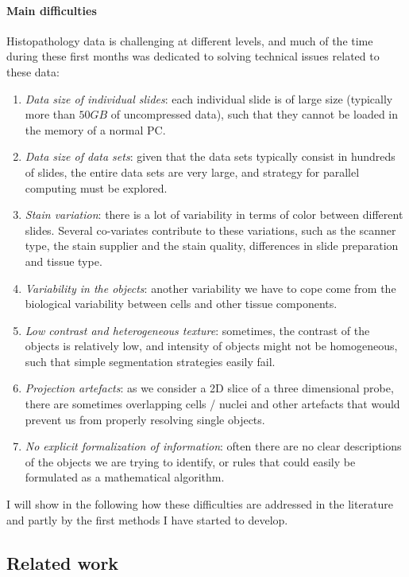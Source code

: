 \documentclass[a4paper,10pt]{article}
\begin{document}
\paragraph{Main difficulties}

Histopathology data is challenging at different levels, and much of
the time during these first months was dedicated to solving technical
issues related to these data: 
\begin{enumerate}
\item {\em Data size of individual slides}: each individual slide is
  of large size (typically more than $50 GB$ of uncompressed data),
  such that they cannot be loaded in the memory of a normal PC. 
\item {\em Data size of data sets}: given that the data sets typically
  consist in hundreds of slides, the entire data sets are very large,
  and strategy for parallel computing must be explored. 
\item {\em Stain variation}: there is a lot of variability in terms of
  color between different slides. Several co-variates contribute to
  these variations, such as the scanner type, the stain supplier and
  the stain quality, differences in slide preparation and tissue
  type. 
\item {\em Variability in the objects}: another variability we have to
  cope come from the biological variability between cells and other
  tissue components. 
\item {\em Low contrast and heterogeneous texture}: sometimes, the contrast of the objects is
  relatively low, and intensity of objects might not be homogeneous,
  such that simple segmentation strategies easily fail. 
\item {\em Projection artefacts}: as we consider a 2D slice of a three
  dimensional probe, there are sometimes overlapping cells / nuclei
  and other artefacts that would prevent us from properly resolving
  single objects.  
\item {\em No explicit formalization of information}: often there are
  no clear descriptions of the objects we are trying to identify, or
  rules that could easily be formulated as a mathematical algorithm.  
\end{enumerate}

I will show in the following how these difficulties are addressed in
the literature and partly by the first methods I have started to
develop. 

\subsection{Related work}
\end{document}
